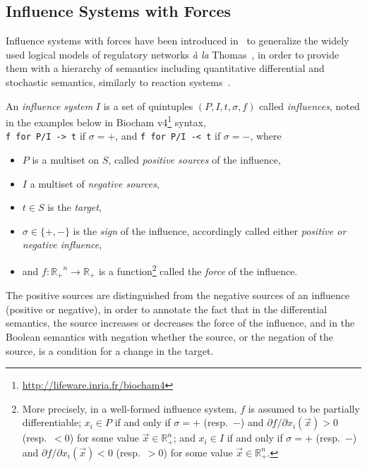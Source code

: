 \documentclass{llncs}
\begin{document}
\subsection{Influence Systems with Forces}


Influence systems with forces have been introduced in~\cite{FMRS16cmsb}
to generalize the widely used logical models of regulatory networks \emph{\`a la} Thomas~\cite{Thomas73jtb},
in order to provide them with a hierarchy of semantics
including quantitative differential and stochastic semantics, similarly to reaction systems~\cite{FS08tcs}.

\begin{definition}
An \emph{influence system}
   $I$ is a set of quintuples $(P, I, t, \sigma, f)$ called \emph{influences}, noted in the examples below in Biocham v4\footnote{\url{http://lifeware.inria.fr/biocham4}} syntax,\\ \verb|f for P/I -> t| if $\sigma=+$, and \verb|f for P/I -< t| if $\sigma=-$,
   where 
\begin{itemize}
\item $P$ is a multiset on $S$, called \emph{positive sources} of the influence, 
\item $I$ a multiset of \emph{negative sources}, 
\item $t\in S$ is the \emph{target},
\item $\sigma\in\{+,-\}$ is the \emph{sign} of the influence, accordingly called either \emph{positive or negative influence},
\item and $f:\mathbb{R_+}^n\to\mathbb{R_+}$ is a function\footnote{More precisely, in a well-formed influence system, $f$ is assumed to be partially differentiable;
$x_i\in P$ if and only if $\sigma = +$ (resp.\ $-$) and
   ${\partial {f}}/ {\partial x_i}(\vec x)>0$ (resp.\ $<0$) for some value
   $\vec x\in\mathbb{R}_+^n$;
 and $x_i\in I$ if and only if $\sigma = +$ (resp.\ $-$) and
   ${\partial {f}}/ {\partial x_i}(\vec x)<0$ (resp.\ $>0$) for some value
  $\vec x\in\mathbb{R}_+^n$.}
called the \emph{force} of the influence.
\end{itemize}
\end{definition}

The positive sources are distinguished from the negative sources of an influence (positive or negative),
in order to annotate the fact that in the differential semantics,
the source increases or decreases the force of the influence,
and in the Boolean semantics with negation whether the source, or the negation of the source,
is a condition for a change in the target.
\end{document}
